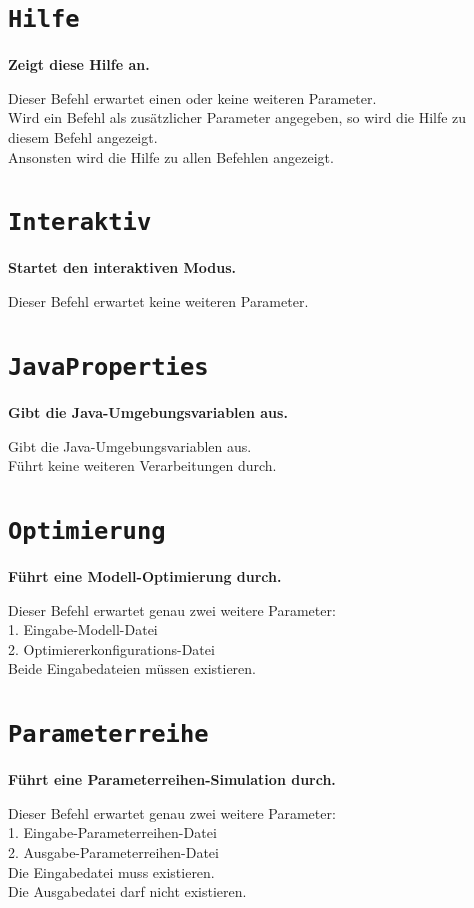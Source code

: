 \section{\texttt{Hilfe}}

\textbf{Zeigt diese Hilfe an.}

Dieser Befehl erwartet einen oder keine weiteren Parameter.\\
Wird ein Befehl als zusätzlicher Parameter angegeben, so wird die Hilfe zu diesem Befehl angezeigt.\\
Ansonsten wird die Hilfe zu allen Befehlen angezeigt.

\section{\texttt{Interaktiv}}

\textbf{Startet den interaktiven Modus.}

Dieser Befehl erwartet keine weiteren Parameter.

\section{\texttt{JavaProperties}}

\textbf{Gibt die Java-Umgebungsvariablen aus.}

Gibt die Java-Umgebungsvariablen aus.\\
Führt keine weiteren Verarbeitungen durch.

\section{\texttt{Optimierung}}

\textbf{Führt eine Modell-Optimierung durch.}

Dieser Befehl erwartet genau zwei weitere Parameter:\\
1. Eingabe-Modell-Datei\\
2. Optimiererkonfigurations-Datei\\
Beide Eingabedateien müssen existieren.

\section{\texttt{Parameterreihe}}

\textbf{Führt eine Parameterreihen-Simulation durch.}

Dieser Befehl erwartet genau zwei weitere Parameter:\\
1. Eingabe-Parameterreihen-Datei\\
2. Ausgabe-Parameterreihen-Datei\\
Die Eingabedatei muss existieren.\\
Die Ausgabedatei darf nicht existieren.

